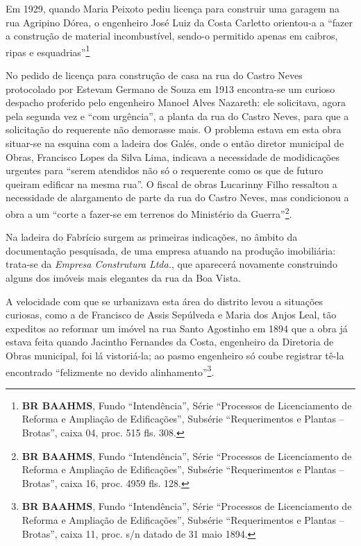 Em 1929, quando Maria Peixoto pediu licença para construir uma garagem na rua Agripino Dórea, o engenheiro José Luiz da Costa Carletto orientou-a a ``fazer a construção de material incombustível, sendo-o permitido apenas em caibros, ripas e esquadrias''\footnote{\textbf{BR BAAHMS}, Fundo ``Intendência'', Série ``Processos de Licenciamento de Reforma e Ampliação de Edificações'', Subsérie ``Requerimentos e Plantas -- Brotas'', caixa 04, proc. 515 fls. 308.}

No pedido de licença para construção de casa na rua do Castro Neves protocolado por Estevam Germano de Souza em 1913 encontra-se um curioso despacho proferido pelo engenheiro Manoel Alves Nazareth: ele solicitava, agora pela segunda vez e ``com urgência'', a planta da rua do Castro Neves, para que a solicitação do requerente não demorasse mais. O problema estava em esta obra situar-se na esquina com a ladeira dos Galés, onde o então diretor municipal de Obras, Francisco Lopes da Silva Lima, indicava a necessidade de modidicações urgentes para ``serem atendidos não só o requerente como os que de futuro queiram edificar na mesma rua''. O fiscal de obras Lucarinny Filho ressaltou a necessidade de alargamento de parte da rua do Castro Neves, mas condicionou a obra a um ``corte a fazer-se em terrenos do Ministério da Guerra''\footnote{\textbf{BR BAAHMS}, Fundo ``Intendência'', Série ``Processos de Licenciamento de Reforma e Ampliação de Edificações'', Subsérie ``Requerimentos e Plantas -- Brotas'', caixa 16, proc. 4959 fls. 128.}.


Na ladeira do Fabrício surgem as primeiras indicações, no âmbito da documentação pesquisada, de uma empresa atuando na produção imobiliária: trata-se da \textit{Empresa Construtura Ltda.}, que aparecerá novamente construindo alguns dos imóveis mais elegantes da rua da Boa Vista.

A velocidade com que se urbanizava esta área do distrito levou a situações curiosas, como a de Francisco de Assis Sepúlveda e Maria dos Anjos Leal, tão expeditos ao reformar um imóvel na rua Santo Agostinho em 1894 que a obra já estava feita quando Jacintho Fernandes da Costa, engenheiro da Diretoria de Obras municipal, foi lá vistoriá-la; ao pasmo engenheiro só coube registrar tê-la encontrado ``felizmente no devido alinhamento''\footnote{\textbf{BR BAAHMS}, Fundo ``Intendência'', Série ``Processos de Licenciamento de Reforma e Ampliação de Edificações'', Subsérie ``Requerimentos e Plantas -- Brotas'', caixa 11, proc. s/n datado de 31 maio 1894.}.

